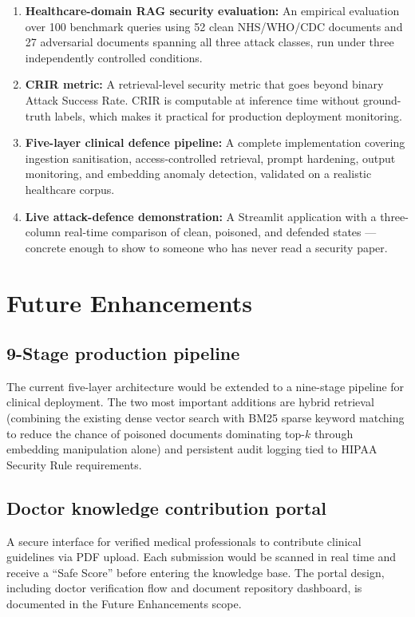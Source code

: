 \begin{enumerate}
    \item \textbf{Healthcare-domain RAG security evaluation:} An empirical evaluation over 100 benchmark queries using 52 clean NHS/WHO/CDC documents and 27 adversarial documents spanning all three attack classes, run under three independently controlled conditions.
    \item \textbf{CRIR metric:} A retrieval-level security metric that goes beyond binary Attack Success Rate. CRIR is computable at inference time without ground-truth labels, which makes it practical for production deployment monitoring.
    \item \textbf{Five-layer clinical defence pipeline:} A complete implementation covering ingestion sanitisation, access-controlled retrieval, prompt hardening, output monitoring, and embedding anomaly detection, validated on a realistic healthcare corpus.
    \item \textbf{Live attack-defence demonstration:} A Streamlit application with a three-column real-time comparison of clean, poisoned, and defended states --- concrete enough to show to someone who has never read a security paper.
\end{enumerate}

\section{Future Enhancements}

\subsection{9-Stage production pipeline}
The current five-layer architecture would be extended to a nine-stage pipeline for clinical deployment. The two most important additions are hybrid retrieval (combining the existing dense vector search with BM25 sparse keyword matching to reduce the chance of poisoned documents dominating top-$k$ through embedding manipulation alone) and persistent audit logging tied to HIPAA Security Rule requirements.

\subsection{Doctor knowledge contribution portal}
A secure interface for verified medical professionals to contribute clinical guidelines via PDF upload. Each submission would be scanned in real time and receive a ``Safe Score'' before entering the knowledge base. The portal design, including doctor verification flow and document repository dashboard, is documented in the Future Enhancements scope.

